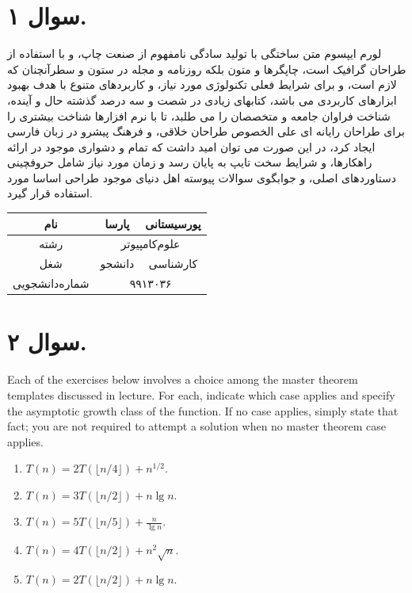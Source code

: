 \documentclass[]{article}
\begin{document}
\section*{سوال ۱.}

لورم ایپسوم متن ساختگی با تولید سادگی نامفهوم از صنعت چاپ، و با استفاده از طراحان گرافیک است، چاپگرها و متون بلکه روزنامه و مجله در ستون و سطرآنچنان که لازم است، و برای شرایط فعلی تکنولوژی مورد نیاز، و کاربردهای متنوع با هدف بهبود ابزارهای کاربردی می باشد، کتابهای زیادی در شصت و سه درصد گذشته حال و آینده، شناخت فراوان جامعه و متخصصان را می طلبد، تا با نرم افزارها شناخت بیشتری را برای طراحان رایانه ای علی الخصوص طراحان خلاقی، و فرهنگ پیشرو در زبان فارسی ایجاد کرد، در این صورت می توان امید داشت که تمام و دشواری موجود در ارائه راهکارها، و شرایط سخت تایپ به پایان رسد و زمان مورد نیاز شامل حروفچینی دستاوردهای اصلی، و جوابگوی سوالات پیوسته اهل دنیای موجود طراحی اساسا مورد استفاده قرار گیرد.
  \begin{center}
    \begin{tabular}{|c|c|c|}
    \hline
         نام & پارسا & پورسیستانی \\
    \hline

رشته &
\multicolumn{2}{|c|}{علوم‌کامپیوتر}
\\
\hline
         شغل & دانشجو & کارشناسی \\
    \hline 
    
    شماره‌دانشجویی &
\multicolumn{2}{|c|}{۹۹۱۳۰۳۶}
\\
\hline
    
    \end{tabular}
  \end{center}
\begin{center}
\end{center}
\newpage
\section*{سوال ۲.}
Each of the exercises below involves a choice among the master theorem templates discussed in lecture.
For each, indicate which case applies and specify the asymptotic growth class of the function.  If no
case applies, simply state that fact; you are not required to attempt a solution when no master theorem case
applies.

\begin{enumerate}
\item $T(n) = 2 T(\lfloor n/4 \rfloor) + n^{1/2}$.
\item $T(n) = 3 T(\lfloor n/2 \rfloor) + n \lg n$.
\item $T(n) = 5 T(\lfloor n/5 \rfloor) + \frac{n}{\lg n}$.
\item $T(n) = 4 T(\lfloor n/2 \rfloor) + n^2 \sqrt{n}$.
\item $T(n) = 2 T(\lfloor n/2 \rfloor) + n \lg n$.
\end{enumerate}
\end{document}
